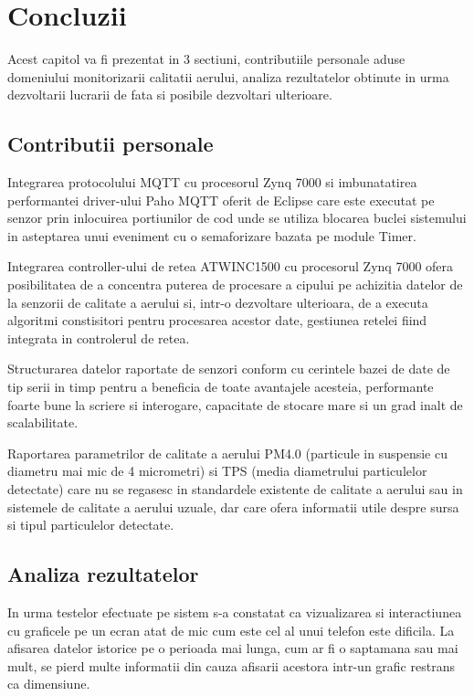 \chapter{Concluzii}
\pagestyle{fancy}

Acest capitol va fi prezentat in 3 sectiuni, contributiile personale aduse domeniului monitorizarii calitatii aerului, analiza rezultatelor obtinute in urma 
dezvoltarii lucrarii de fata si posibile dezvoltari ulterioare.

\section{Contributii personale}\label{c_contributii}
Integrarea protocolului MQTT cu procesorul Zynq 7000 si imbunatatirea performantei driver-ului Paho MQTT oferit de Eclipse care este executat pe senzor prin 
inlocuirea portiunilor de cod unde se utiliza blocarea buclei sistemului in asteptarea unui eveniment cu o semaforizare bazata pe module Timer.

Integrarea controller-ului de retea ATWINC1500 cu procesorul Zynq 7000 ofera posibilitatea de a concentra puterea de procesare a cipului pe achizitia datelor de 
la senzorii de calitate a aerului si, intr-o dezvoltare ulterioara, de a executa algoritmi constisitori pentru procesarea acestor date, gestiunea 
retelei fiind integrata in controlerul de retea.

Structurarea datelor raportate de senzori conform cu cerintele bazei de date de tip serii in timp pentru a beneficia de toate avantajele acesteia, performante 
foarte bune la scriere si interogare, capacitate de stocare mare si un grad inalt de scalabilitate.

Raportarea parametrilor de calitate a aerului PM4.0 (particule in suspensie cu diametru mai mic de 4 micrometri) si TPS (media diametrului particulelor detectate) 
care nu se regasesc in standardele existente de calitate a aerului sau in sistemele de calitate a aerului uzuale, dar care ofera informatii utile despre sursa si 
tipul particulelor detectate.

\section{Analiza rezultatelor}\label{c_analiza_rezultate}
In urma testelor efectuate pe sistem s-a constatat ca vizualizarea si interactiunea cu graficele pe un ecran atat de mic cum este cel al unui telefon este dificila. La 
afisarea datelor istorice pe o perioada mai lunga, cum ar fi o saptamana sau mai mult, se pierd multe informatii din cauza afisarii acestora intr-un grafic restrans 
ca dimensiune. 

